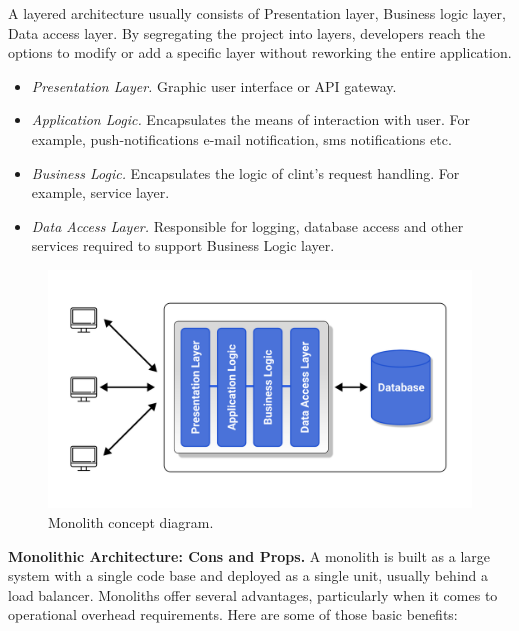 A layered architecture usually consists of Presentation layer, Business logic layer, Data access layer.
By segregating the project into layers, developers reach the options to modify or add a specific layer
without reworking the entire application.

\begin{itemize}
    \item \textit{Presentation Layer.} Graphic user interface or API gateway.
    \item \textit{Application Logic.} Encapsulates the means of interaction with user.
    For example, push-notifications e-mail notification, sms notifications etc.
    \item \textit{Business Logic.} Encapsulates the logic of clint's request handling.
    For example, service layer.
    \item \textit{Data Access Layer.} Responsible for logging, database access and other services required to support
    Business Logic layer.
\end{itemize}

\begin{figure}[H]
    \centering
    \includegraphics[width=1\textwidth]{Pictures/03_Monolith_concept_diagram}
    \caption{Monolith concept diagram.}\label{fig:figure2}
\end{figure}

\textbf{Monolithic Architecture: Cons and Props.} A monolith is built as a large system with a single code base and
deployed as a single unit, usually behind a load balancer.
Monoliths offer several advantages, particularly when it comes to operational overhead requirements.
Here are some of those basic benefits:

